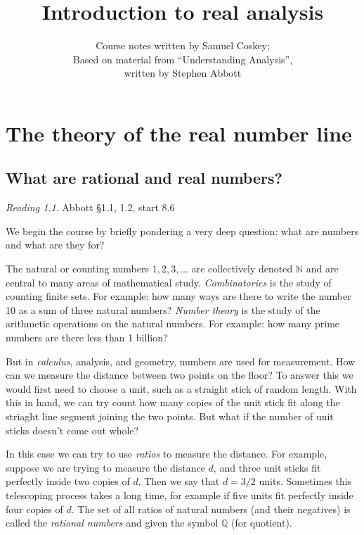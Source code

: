 \documentclass[11pt,oneside]{amsbook}
\title{Introduction to real analysis}
\author{Course notes written by Samuel Coskey;\\Based on material from ``Understanding Analysis'',\\written by Stephen Abbott}
\newcommand{\N}{\mathbb N}
\newcommand{\Q}{\mathbb Q}
\theoremstyle{definition}
\theoremstyle{plain}
\theoremstyle{definition}
\theoremstyle{remark}
\newtheorem*{reading}{Reading}
\numberwithin{equation}{section}
\numberwithin{figure}{section}
\begin{document}
\maketitle

\tableofcontents

\chapter{The theory of the real number line}

\section{What are rational and real numbers?}

\begin{reading}
  Abbott \S 1.1, 1.2, start 8.6
\end{reading}


We begin the course by briefly pondering a very deep question: what are numbers and what are they for?

The natural or counting numbers $1,2,3,\ldots$ are collectively denoted $\N$ and are central to many areas of mathematical study. \emph{Combinatorics} is the study of counting finite sets. For example: how many ways are there to write the number 10 as a sum of three natural numbers? \emph{Number theory} is the study of the arithmetic operations on the natural numbers. For example: how many prime numbers are there less than 1 billion?

But in \emph{calculus}, analysis, and geometry, numbers are used for measurement. How can we measure the distance between two points on the floor? To answer this we would first need to choose a unit, such as a straight stick of random length. With this in hand, we can try count how many copies of the unit stick fit along the striaght line segment joining the two points. But what if the number of unit sticks doesn't come out whole?

In this case we can try to use \emph{ratios} to measure the distance. For example, suppose we are trying to measure the distance $d$, and three unit sticks fit perfectly inside two copies of $d$. Then we say that $d=3/2$ units. Sometimes this telescoping process takes a long time, for example if five units fit perfectly inside four copies of $d$. The set of all ratios of natural numbers (and their negatives) is called the \emph{rational numbers} and given the symbol $\Q$ (for quotient).
\end{document}
